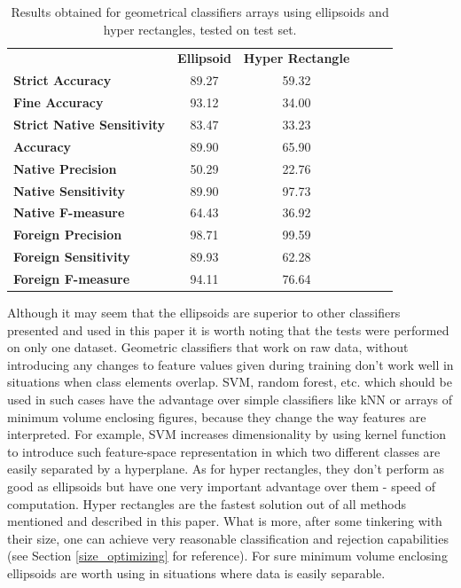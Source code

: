 \begin{table}[htp]
	\centering
	\caption{Results obtained for geometrical classifiers arrays using ellipsoids and hyper rectangles, tested on test set.}
	\label{ellipsoid_arrays_results_test}
	\begin{tabular}{l|c|c|lll}
		\cline{2-3}
		& \multicolumn{1}{l|}{\textbf{Ellipsoid}} & \textbf{Hyper Rectangle} &  &  &  \\ \cline{1-3}
		\multicolumn{1}{|l|}{\textbf{Strict Accuracy}}           & 89.27 & 59.32 \\ \cline{1-3}
		\multicolumn{1}{|l|}{\textbf{Fine Accuracy}}             & 93.12 & 34.00 \\ \cline{1-3}
		\multicolumn{1}{|l|}{\textbf{Strict Native Sensitivity}} & 83.47 & 33.23 \\ \cline{1-3}
		\multicolumn{1}{|l|}{\textbf{Accuracy}}                  & 89.90 & 65.90 \\ \cline{1-3}
		\multicolumn{1}{|l|}{\textbf{Native Precision}}          & 50.29 & 22.76 \\ \cline{1-3}
		\multicolumn{1}{|l|}{\textbf{Native Sensitivity}}        & 89.90 & 97.73 \\ \cline{1-3}
		\multicolumn{1}{|l|}{\textbf{Native F-measure}}          & 64.43 & 36.92 \\ \cline{1-3}
		\multicolumn{1}{|l|}{\textbf{Foreign Precision}}         & 98.71 & 99.59 \\ \cline{1-3}
		\multicolumn{1}{|l|}{\textbf{Foreign Sensitivity}}       & 89.93 & 62.28 \\ \cline{1-3}
		\multicolumn{1}{|l|}{\textbf{Foreign F-measure}}         & 94.11 & 76.64 \\ \cline{1-3}
	\end{tabular}
\end{table}

Although it may seem that the ellipsoids are superior to other classifiers presented and used in this paper it is worth noting that the tests were performed on only one dataset. Geometric classifiers that work on raw data, without introducing any changes to feature values given during training don't work well in situations when class elements overlap. SVM, random forest, etc. which should be used in such cases have the advantage over simple classifiers like kNN or arrays of minimum volume enclosing figures, because they change the way features are interpreted. For example, SVM increases dimensionality by using kernel function to introduce such feature-space representation in which two different classes are easily separated by a hyperplane. As for hyper rectangles, they don't perform as good as ellipsoids but have one very important advantage over them - speed of computation. Hyper rectangles are the fastest solution out of all methods mentioned and described in this paper. What is more, after some tinkering with their size, one can achieve very reasonable classification and rejection capabilities (see Section \ref{size_optimizing} for reference). For sure minimum volume enclosing ellipsoids are worth using in situations where data is easily separable.

